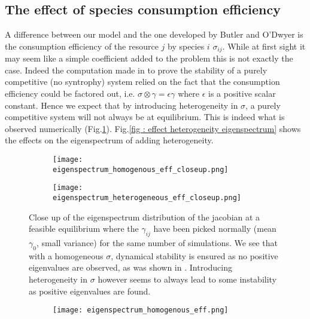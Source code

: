 \documentclass[12pt]{article}
\begin{document}
\begin{appendices}
	\clearpage
	\section{The effect of species consumption efficiency}
	A difference between our model and the one developed by Butler and O'Dwyer \cite{Butler:2018aa} is the consumption efficiency of the resource $j$ by species $i$ $\sigma_{ij}$. While at first sight it may seem like a simple coefficient added to the problem this is not exactly the case. Indeed the computation made in \cite{Butler:2018aa} to prove the stability of a purely competitive (no syntrophy) system relied on the fact that the consumption efficiency could be factored out, i.e. $\sigma \otimes \gamma  = \epsilon \gamma$ where $\epsilon$ is a positive scalar constant. Hence we expect that by introducing heterogeneity in $\sigma$, a purely competitive system will not always be at equilibrium. This is indeed what is observed numerically (Fig.\ref{fig : effect heterogeneity stability}). Fig.\ref{fig : effect heterogeneity eigenspectrum} shows the effects on the eigenspectrum of adding heterogeneity.
	\begin{figure}[h!]
		\centering
		\begin{subfigure}{0.49\textwidth}
			\texttt{[image: eigenspectrum\_homogenous\_eff\_closeup.png]}
		\end{subfigure}
		\begin{subfigure}{0.49\textwidth}
			\texttt{[image: eigenspectrum\_heterogeneous\_eff\_closeup.png]}
		\end{subfigure}
		\caption{Close up of the eigenspectrum distribution of the jacobian at a feasible equilibrium where the $\gamma_{ij}$ have been picked normally (mean $\gamma_0$, small variance) for the same number of simulations. We see that with a homogeneous $\sigma$, dynamical stability is ensured as no positive eigenvalues are observed, as was shown in \cite{Butler:2018aa}. Introducing heterogeneity in $\sigma$ however seems to always lead to some instability as positive eigenvalues are found.}\label{fig : effect heterogeneity stability} 
	\end{figure}
	\begin{figure}
		\centering
		\begin{subfigure}{0.49\textwidth}
			\texttt{[image: eigenspectrum\_homogenous\_eff.png]}
		\end{subfigure}

\end{figure}
\end{appendices}
\end{document}
